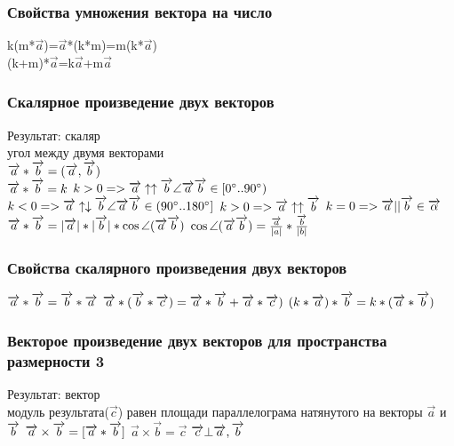 \documentclass{article}
\begin{document}
\subsubsection{Свойства умножения вектора на число}
k(m*$\overrightarrow{a}$)=$\overrightarrow{a}$*(k*m)=m(k*$\overrightarrow{a}$)\\
(k+m)*$\overrightarrow{a}$=k$\overrightarrow{a}$+m$\overrightarrow{a}$\\
\subsubsection{Скалярное произведение двух векторов}
Результат: скаляр\\
угол между двумя векторами\\
$\overrightarrow{a}*\overrightarrow{b}=(\overrightarrow{a},\overrightarrow{b})\\$
\\
$\overrightarrow{a}*\overrightarrow{b}=k\\$
$k>0 => \overrightarrow{a}\uparrow\uparrow\overrightarrow{b}   \angle\overrightarrow{a}\overrightarrow{b}\in[0^\circ..90^\circ)\\$
$k<0 => \overrightarrow{a}\uparrow\downarrow\overrightarrow{b}   \angle\overrightarrow{a}\overrightarrow{b}\in(90^\circ..180^\circ]\\$
$k>0 => \overrightarrow{a}\uparrow\uparrow\overrightarrow{b}\\$
$k=0 => \overrightarrow{a}||\overrightarrow{b}\in \overrightarrow{\alpha }\\$
$\overrightarrow{a}*\overrightarrow{b}=|\overrightarrow{a}|*|\overrightarrow{b}|*\cos\angle(\overrightarrow{a}\overrightarrow{b})\\$
$\cos\angle(\overrightarrow{a}\overrightarrow{b}) = \frac{\overrightarrow{a}}{|a|}*\frac{\overrightarrow{b}}{|b|}\\$
\subsubsection{Свойства скалярного произведения двух векторов}
$\overrightarrow{a}*\overrightarrow{b}=\overrightarrow{b}*\overrightarrow{a}\\$
$\overrightarrow{a}*(\overrightarrow{b}*\overrightarrow{c})=\overrightarrow{a}*\overrightarrow{b}+\overrightarrow{a}*\overrightarrow{c})\\$
$(k*\overrightarrow{a})*\overrightarrow{b}=k*(\overrightarrow{a}*\overrightarrow{b})\\$
\subsubsection{Векторое произведение двух векторов для пространства размерности 3}
Результат: вектор\\
модуль результата($\overrightarrow{c}$) равен площади параллелограма натянутого на векторы $\overrightarrow{a}$ и $\overrightarrow{b}\\$
$\overrightarrow{a}\times\overrightarrow{b}=[\overrightarrow{a}*\overrightarrow{b}]\\$
$\overrightarrow{a}\times\overrightarrow{b}=\overrightarrow{c}$
$\overrightarrow{c}\bot\overrightarrow{a},\overrightarrow{b}\\$
\end{document}
